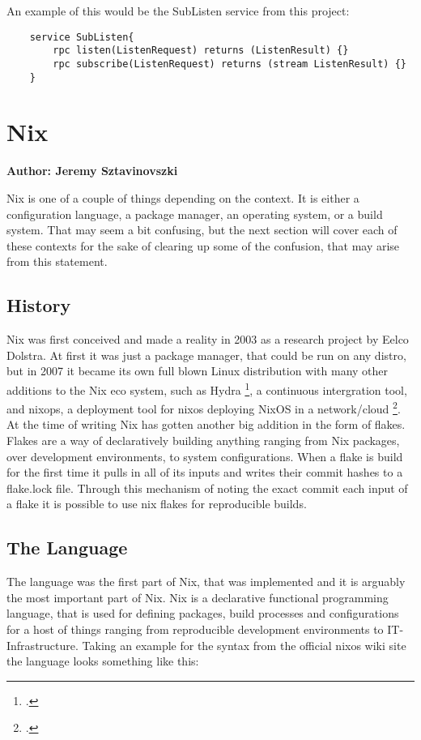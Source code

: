 An example of this would be the SubListen service from this project:

\begin{verbatim}
    service SubListen{
        rpc listen(ListenRequest) returns (ListenResult) {}
        rpc subscribe(ListenRequest) returns (stream ListenResult) {}
    }
\end{verbatim}

\section{Nix}
\textbf{Author: Jeremy Sztavinovszki}

Nix is one of a couple of things depending on the context. It is either a configuration language, a package manager, an operating system, or a build system.
That may seem a bit confusing, but the next section will cover each of these contexts for the sake of clearing up some of the confusion, that may arise from this statement.

\subsection{History}
Nix was first conceived and made a reality in 2003 as a research project by Eelco Dolstra. At first it was just a package manager, that could be run on any distro, but in 2007 it became its
own full blown Linux distribution with many other additions to the Nix eco system, such as Hydra \footcite{hydra}, a continuous intergration tool, and nixops,
a deployment tool for nixos deploying NixOS in a network/cloud \footcite{NixOps}. At the time of writing Nix has gotten another big addition in the form of flakes.
Flakes are a way of declaratively building anything ranging from Nix packages, over development environments, to system configurations. When a flake is build for the first time it
pulls in all of its inputs and writes their commit hashes to a flake.lock file. Through this mechanism of noting the exact commit each input of a flake it is possible to use nix flakes for
reproducible builds.

\subsection{The Language}
The language was the first part of Nix, that was implemented and it is arguably the most important part of Nix. Nix is a declarative functional programming language,
that is used for defining packages, build processes and configurations for a host of things ranging from reproducible development environments to IT-Infrastructure.
Taking an example for the syntax from the official nixos wiki site the language looks something like this:

